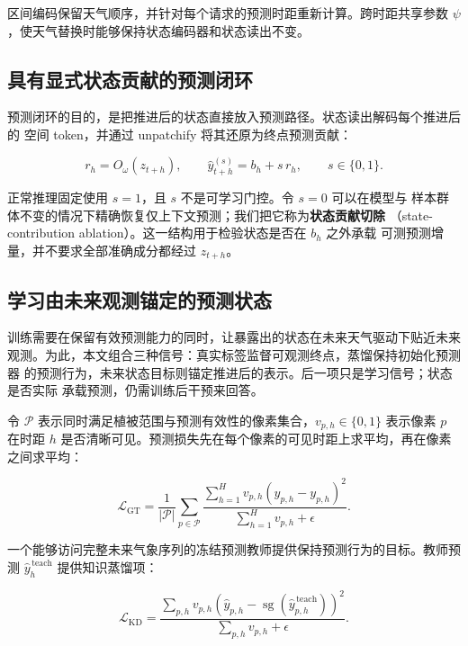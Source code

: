 \documentclass[11pt,a4paper,fontset=fandol]{ctexart}
\begin{document}
区间编码保留天气顺序，并针对每个请求的预测时距重新计算。跨时距共享参数 $\psi$，使天气替换时能够保持状态编码器和状态读出不变。

\subsection{具有显式状态贡献的预测闭环}

预测闭环的目的，是把推进后的状态直接放入预测路径。状态读出解码每个推进后的 空间 token，并通过 unpatchify 将其还原为终点预测贡献：

\begin{equation*}
r_h=O_\omega(z_{t+h}),\qquad
\widehat y_{t+h}^{(s)}=b_h+s\,r_h,\qquad s\in\{0,1\}.
\tag{5}
\end{equation*}

正常推理固定使用 $s=1$，且 $s$ 不是可学习门控。令 $s=0$ 可以在模型与 样本群体不变的情况下精确恢复仅上下文预测；我们把它称为\textbf{状态贡献切除} （state-contribution ablation）。这一结构用于检验状态是否在 $b_h$ 之外承载 可测预测增量，并不要求全部准确成分都经过 $z_{t+h}$。

\subsection{学习由未来观测锚定的预测状态}

训练需要在保留有效预测能力的同时，让暴露出的状态在未来天气驱动下贴近未来 观测。为此，本文组合三种信号：真实标签监督可观测终点，蒸馏保持初始化预测器 的预测行为，未来状态目标则锚定推进后的表示。后一项只是学习信号；状态是否实际 承载预测，仍需训练后干预来回答。

令 $\mathcal P$ 表示同时满足植被范围与预测有效性的像素集合，$v_{p,h}\in\{0,1\}$ 表示像素 $p$ 在时距 $h$ 是否清晰可见。预测损失先在每个像素的可见时距上求平均，再在像素之间求平均：

\begin{equation*}
\mathcal L_{\mathrm{GT}}
=\frac{1}{|\mathcal P|}\sum_{p\in\mathcal P}
\frac{\sum_{h=1}^{H}v_{p,h}(\widehat y_{p,h}-y_{p,h})^2}
{\sum_{h=1}^{H}v_{p,h}+\epsilon}.
\tag{6}
\end{equation*}

一个能够访问完整未来气象序列的冻结预测教师提供保持预测行为的目标。教师预测 $\widehat y_h^{\,\mathrm{teach}}$ 提供知识蒸馏项：

\begin{equation*}
\mathcal L_{\mathrm{KD}}
=\frac{\sum_{p,h}v_{p,h}
(\widehat y_{p,h}-\operatorname{sg}(\widehat y_{p,h}^{\,\mathrm{teach}}))^2}
{\sum_{p,h}v_{p,h}+\epsilon}.
\tag{7}
\end{equation*}
\end{document}
